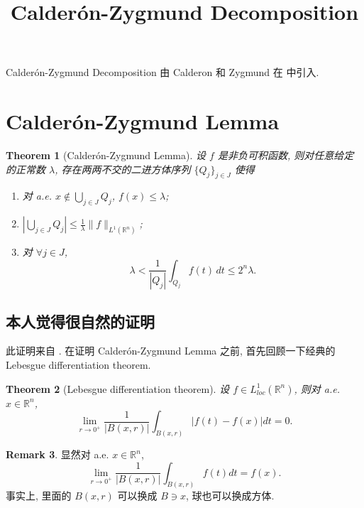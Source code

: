 \documentclass[a4paper,11pt]{article}
\title{Calder\'on-Zygmund Decomposition}
\newtheorem{theorem}{Theorem}[section]
\theoremstyle{definition}
\newtheorem{remark}[theorem]{Remark}
\begin{document}
\maketitle

Calder\'on-Zygmund Decomposition 由 Calderon 和 Zygmund 在 \cite{cz52} 中引入.

\section{Calder\'on-Zygmund Lemma}

\begin{theorem}[Calder\'on-Zygmund Lemma] \label{C-Z lemma}
    设 $ f $ 是非负可积函数, 则对任意给定的正常数 $ \lambda $, 存在两两不交的二进方体序列 $ \{Q_j\}_{j \in J} $ 
    使得
    \begin{enumerate}[{\rm(i)}]
        \item 对 a.e. $ x \notin \bigcup_{j \in J} Q_j $, $ f(x) \leq \lambda $;
        \item $ | \bigcup_{j \in J} Q_j | \leq \frac{1}{\lambda} \| f \|_{L^1(\mathbb{R}^n)} $;
        \item 对 $ \forall j \in J $, 
            $$
                \lambda < \frac{1}{|Q_j|} \int_{Q_j} f(t) \, dt \leq 2^n \lambda.
            $$
    \end{enumerate}
\end{theorem}

\subsection{本人觉得很自然的证明}

此证明来自 \cite[Lemma 1.2]{kk13}. 
在证明 Calder\'on-Zygmund Lemma 之前, 首先回顾一下经典的 Lebesgue differentiation theorem.

\begin{theorem}[Lebesgue differentiation theorem]
    设 $ f \in L^1_{loc}(\mathbb{R}^n) $, 则对 a.e. $ x \in \mathbb{R}^n $, 
    $$
        \lim_{r \to 0^+} \frac{1}{|B(x, r)|} \int_{B(x, r)} |f(t) - f(x)| dt = 0.
    $$
\end{theorem}

\begin{remark}
    显然对 a.e. $ x \in \mathbb{R}^n $,
    $$
        \lim_{r \to 0^+} \frac{1}{|B(x, r)|} \int_{B(x, r)} f(t) dt = f(x).
    $$
    事实上, 里面的 $ B(x, r) $ 可以换成 $ B \ni x $, 球也可以换成方体.
\end{remark}
\end{document}
